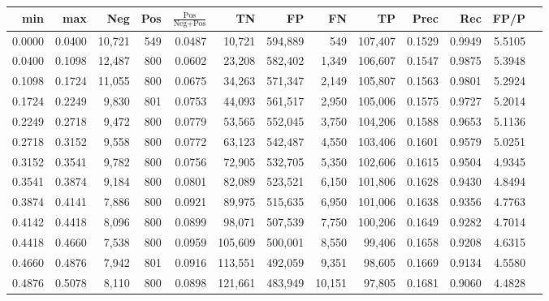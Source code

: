 \begin{tabular}{rrrrrrrrrrrrr}
\toprule
   min &    max &    Neg & Pos & $\frac{\text{Pos}}{\text{Neg}+\text{Pos}}$ &      TN &      FP &      FN &      TP &   Prec &    Rec &   FP/P \\
\midrule
0.0000 & 0.0400 & 10,721 & 549 &                                     0.0487 &  10,721 & 594,889 &     549 & 107,407 & 0.1529 & 0.9949 & 5.5105 \\
0.0400 & 0.1098 & 12,487 & 800 &                                     0.0602 &  23,208 & 582,402 &   1,349 & 106,607 & 0.1547 & 0.9875 & 5.3948 \\
0.1098 & 0.1724 & 11,055 & 800 &                                     0.0675 &  34,263 & 571,347 &   2,149 & 105,807 & 0.1563 & 0.9801 & 5.2924 \\
0.1724 & 0.2249 &  9,830 & 801 &                                     0.0753 &  44,093 & 561,517 &   2,950 & 105,006 & 0.1575 & 0.9727 & 5.2014 \\
0.2249 & 0.2718 &  9,472 & 800 &                                     0.0779 &  53,565 & 552,045 &   3,750 & 104,206 & 0.1588 & 0.9653 & 5.1136 \\
0.2718 & 0.3152 &  9,558 & 800 &                                     0.0772 &  63,123 & 542,487 &   4,550 & 103,406 & 0.1601 & 0.9579 & 5.0251 \\
0.3152 & 0.3541 &  9,782 & 800 &                                     0.0756 &  72,905 & 532,705 &   5,350 & 102,606 & 0.1615 & 0.9504 & 4.9345 \\
0.3541 & 0.3874 &  9,184 & 800 &                                     0.0801 &  82,089 & 523,521 &   6,150 & 101,806 & 0.1628 & 0.9430 & 4.8494 \\
0.3874 & 0.4141 &  7,886 & 800 &                                     0.0921 &  89,975 & 515,635 &   6,950 & 101,006 & 0.1638 & 0.9356 & 4.7763 \\
0.4142 & 0.4418 &  8,096 & 800 &                                     0.0899 &  98,071 & 507,539 &   7,750 & 100,206 & 0.1649 & 0.9282 & 4.7014 \\
0.4418 & 0.4660 &  7,538 & 800 &                                     0.0959 & 105,609 & 500,001 &   8,550 &  99,406 & 0.1658 & 0.9208 & 4.6315 \\
0.4660 & 0.4876 &  7,942 & 801 &                                     0.0916 & 113,551 & 492,059 &   9,351 &  98,605 & 0.1669 & 0.9134 & 4.5580 \\
0.4876 & 0.5078 &  8,110 & 800 &                                     0.0898 & 121,661 & 483,949 &  10,151 &  97,805 & 0.1681 & 0.9060 & 4.4828 \\

\end{tabular}
